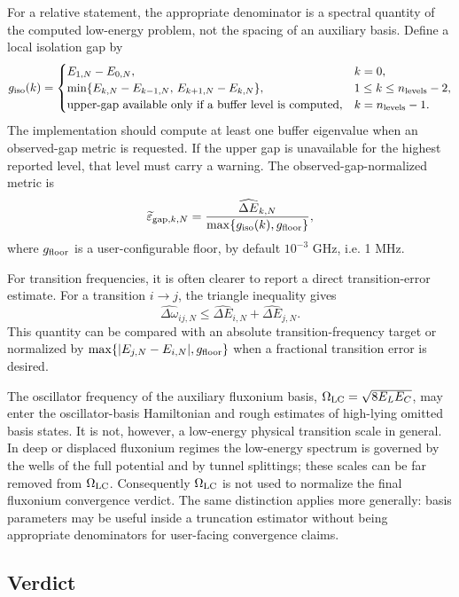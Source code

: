 \documentclass[11pt,a4paper]{article}
\newcommand{\eps}{\varepsilon}
\newcommand{\wLC}{\Omega_{\rm LC}}
\newcommand{\errhat}{\widehat{\Delta E}}
\newcommand{\gfloor}{g_{\rm floor}}
\newcommand{\giso}{g_{\rm iso}}
\begin{document}
For a relative statement, the appropriate denominator is a spectral quantity of the computed low-energy problem, not the spacing of an auxiliary basis.  Define a local isolation gap by
\begin{equation}
  \giso(k)=
  \begin{cases}
  E_{1,N}-E_{0,N}, & k=0,\\
  \min\{E_{k,N}-E_{k-1,N},\,E_{k+1,N}-E_{k,N}\}, & 1\le k\le n_{\rm levels}-2,\\
  \text{upper-gap available only if a buffer level is computed}, & k=n_{\rm levels}-1.
  \end{cases}
\end{equation}
The implementation should compute at least one buffer eigenvalue when an observed-gap metric is requested.  If the upper gap is unavailable for the highest reported level, that level must carry a warning.  The observed-gap-normalized metric is
\begin{equation}
  \widetilde\eps_{{\rm gap},k,N}
  =\frac{\errhat_{k,N}}{\max\{\giso(k),\gfloor\}},
\end{equation}
where \(\gfloor\) is a user-configurable floor, by default \(10^{-3}\) GHz, i.e. 1 MHz.

For transition frequencies, it is often clearer to report a direct transition-error estimate.  For a transition \(i\to j\), the triangle inequality gives
\begin{equation}
  \widehat{\Delta\omega}_{ij,N}\le \errhat_{i,N}+\errhat_{j,N}.
\end{equation}
This quantity can be compared with an absolute transition-frequency target or normalized by \(\max\{|E_{j,N}-E_{i,N}|,\gfloor\}\) when a fractional transition error is desired.

The oscillator frequency of the auxiliary fluxonium basis,
\(\wLC=\sqrt{8E_LE_C}\), may enter the oscillator-basis Hamiltonian and rough estimates of high-lying omitted basis states.  It is not, however, a low-energy physical transition scale in general.  In deep or displaced fluxonium regimes the low-energy spectrum is governed by the wells of the full potential and by tunnel splittings; these scales can be far removed from \(\wLC\).  Consequently \(\wLC\) is not used to normalize the final fluxonium convergence verdict.  The same distinction applies more generally: basis parameters may be useful inside a truncation estimator without being appropriate denominators for user-facing convergence claims.

\subsection{Verdict}
\end{document}
